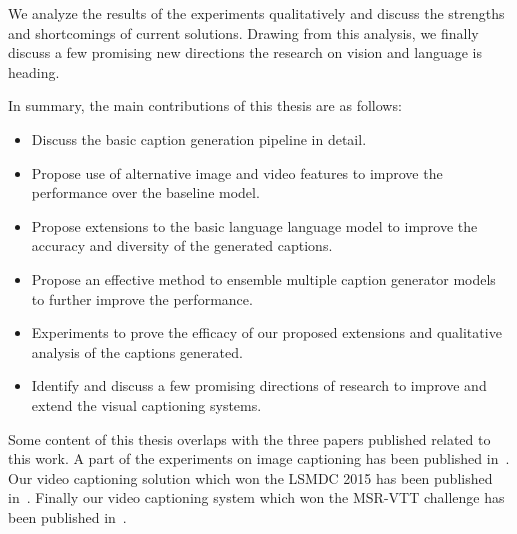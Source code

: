 We analyze the results of the experiments qualitatively and discuss the
strengths and shortcomings of current solutions. 
Drawing from this analysis, we finally discuss a few promising new directions the
research on vision and language is heading.

In summary, the main contributions of this thesis are as follows:
\begin{itemize}
  \item Discuss the basic caption generation pipeline in detail. 
  \item Propose use of alternative image and video features to improve the
          performance over the baseline model.
  \item Propose extensions to the basic language language model to improve the
          accuracy and diversity of the generated captions.
  \item Propose an effective method to ensemble multiple caption generator
          models to further improve the performance.
  \item Experiments to prove the efficacy of our proposed extensions and qualitative
          analysis of the captions generated.
  \item Identify and discuss a few promising directions of research to improve
          and extend the visual captioning systems.
       
\end{itemize}

Some content of this thesis overlaps with the three papers published related to
this work.
A part of the experiments on image captioning has been published
in~\cite{ShettyACMMM2016Wrk}.
Our video captioning solution which won the LSMDC 2015 has been published
in~\cite{shetty2015video}.
Finally our video captioning system which won the MSR-VTT challenge has been
published in~\cite{ShettyACMMM2016}.
